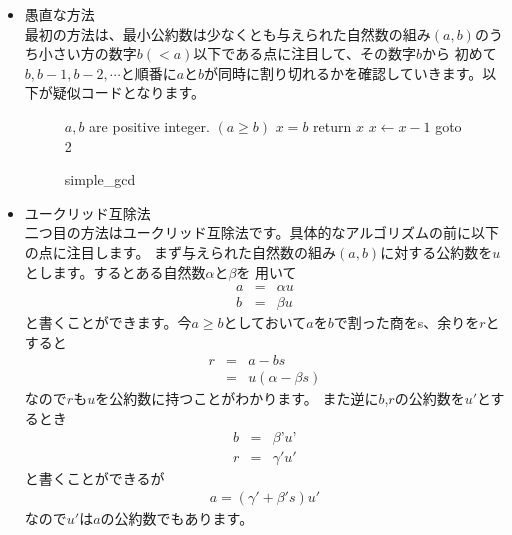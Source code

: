 \documentclass[dvipdfmx]{jarticle}
\begin{document}
\begin{itemize}
\item 愚直な方法\\
最初の方法は、最小公約数は少なくとも与えられた自然数の組み$(a,b)$のうち小さい方の数字$b(<a)$以下である点に注目して、その数字$b$から
初めて$b,b-1,b-2,\cdots$と順番に$a$と$b$が同時に割り切れるかを確認していきます。以下が疑似コードとなります。
\begin{figure}[H]
\begin{algorithm}[H]
	\caption{simple\_gcd}
	\label{alg1}
	\begin{algorithmic}[1]  
	\REQUIRE $a,b$ are positive integer. $(a\geq b)$
    	\STATE $x = b$
    	\STATE return $x$
	\ENDIF
    	\STATE $x \leftarrow x-1$
	\STATE goto 2
	\end{algorithmic}
\end{algorithm}
\end{figure}
\item ユークリッド互除法\\
二つ目の方法はユークリッド互除法です。具体的なアルゴリズムの前に以下の点に注目します。
まず与えられた自然数の組み$(a,b)$に対する公約数を$u$とします。するとある自然数$\alpha$と$\beta$を
用いて
\begin{eqnarray}
a&=&\alpha u\\
b&=&\beta u
\end{eqnarray}
と書くことができます。今$a\geq b$としておいて$a$を$b$で割った商をs、余りを$r$とすると
\begin{eqnarray}
r&=&a-bs\\
&=&u(\alpha-\beta s)
\end{eqnarray}
なので$r$も$u$を公約数に持つことがわかります。
また逆に$b$,$r$の公約数を$u'$とするとき
\begin{eqnarray}
b&=&\beta’u’\\
r&=&\gamma'u'
\end{eqnarray}
と書くことができるが
\begin{eqnarray}
a=(\gamma'+\beta' s)u'
\end{eqnarray}
なので$u'$は$a$の公約数でもあります。


\end{itemize}
\end{document}
